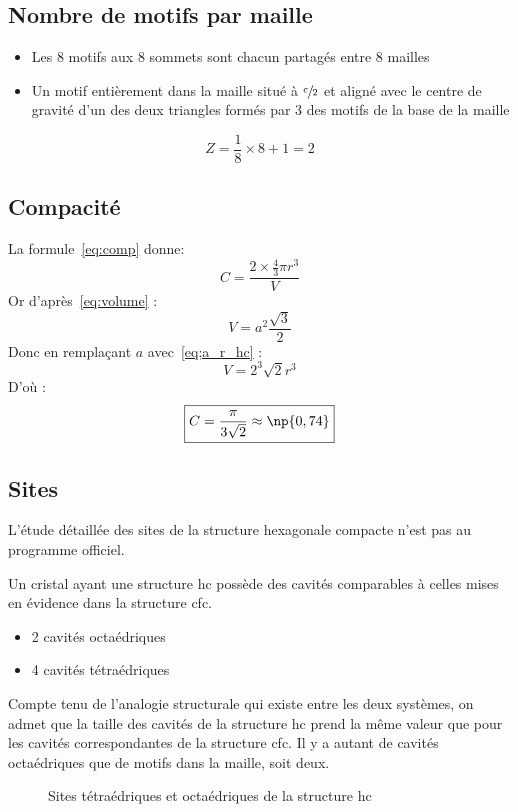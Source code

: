 \subsection{Nombre de motifs par maille}
\begin{itemize}
    \item Les 8 motifs aux 8 sommets sont chacun partagés entre
        8 mailles
    \item Un motif entièrement dans la maille situé à
        $\sfrac{c}{2}$ et aligné avec le centre de gravité d'un
        des deux triangles formés par 3 des motifs de la base de
        la maille
\end{itemize}
\begin{equation}
    Z = \frac{1}{8} \times 8 + 1 = 2
\end{equation}

\subsection{Compacité}
La formule~\ref{eq:comp} donne:
\begin{equation*}
    C = \frac{2 \times \frac{4}{3}\pi r^3}{V}
\end{equation*}
Or d'après~\ref{eq:volume} :
\begin{equation*}
    V=a^2 \frac{\sqrt{3}}{2}
\end{equation*}
Donc en remplaçant $a$ avec~\ref{eq;a_r_hc} :
\begin{equation}
    V=2^3\sqrt{2}r^3 \label{eq:V_hc}
\end{equation}
D'où :
\begin{equation}
    \boxed{C = \frac{\pi}{3\sqrt{2}} \approx \np{0,74}}
    \label{eq:comp_hc}
\end{equation}

\subsection{Sites}
\begin{rem}
    L'étude détaillée des sites de la structure hexagonale
    compacte n'est pas au programme officiel.
\end{rem}
Un cristal ayant une structure hc possède des cavités comparables
à celles mises en évidence dans la structure cfc.
\begin{itemize}
    \item 2 cavités octaédriques
    \item 4 cavités tétraédriques
\end{itemize}
Compte tenu de l’analogie structurale qui existe entre les deux
systèmes, on admet que la taille des cavités de la structure
hc prend la même valeur que pour les cavités correspondantes
de la structure cfc. Il y a autant de cavités octaédriques que
de motifs dans la maille, soit deux.
\begin{figure}
    \centering
    
    \caption{Sites tétraédriques et octaédriques
        de la structure hc}
\end{figure}

